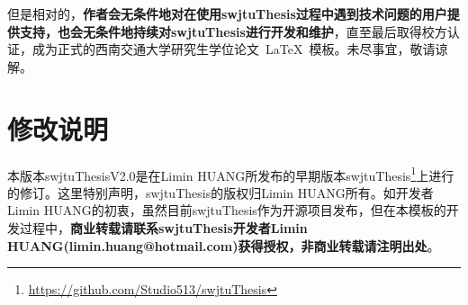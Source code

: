 \par
但是相对的，\textbf{作者会无条件地对在使用swjtuThesis过程中遇到技术问题的用户提供支持，也会无条件地持续对swjtuThesis进行开发和维护}，直至最后取得校方认证，成为正式的西南交通大学研究生学位论文~\LaTeX{}~模板。未尽事宜，敬请谅解。


\section{修改说明}
本版本swjtuThesisV2.0是在Limin HUANG所发布的早期版本swjtuThesis\footnote{\url{https://github.com/Studio513/swjtuThesis}}上进行的修订。这里特别声明，swjtuThesis的版权归Limin HUANG所有。如开发者Limin HUANG的初衷，虽然目前swjtuThesis作为开源项目发布，但在本模板的开发过程中，\textbf{商业转载请联系swjtuThesis开发者Limin HUANG(limin.huang@hotmail.com)获得授权，非商业转载请注明出处}。